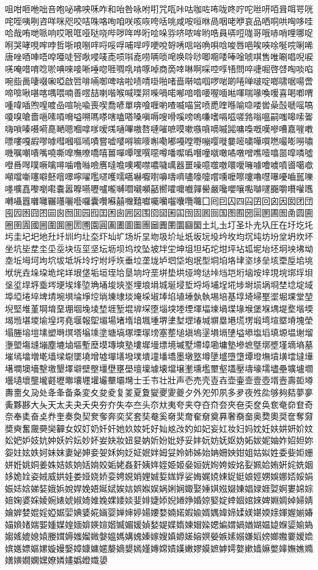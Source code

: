咀咁咂咃咄咅咆咇咈咉咊咋和咍咎咏咐咑咒咓咔咕咖咗咘咙咚咛咜咝咞咟咠咡咢咣咤咥咦咧咨咩咪咫咬咭咮咯咰咱咲咳咴咵咶咷咸咹咺咻咼咽咾咿哀品哂哃哄哅哆哇哈哉哊哋哌响哎哏哐哑哒哓哔哕哖哗哘哙哚哛哜哝哞哟哠員哢哣哤哥哦哧哨哩哪哫哬哭哮哯哰哱哲哳哴哵哶哷哸哹哺哻哼哽哾哿唀唁唂唃唄唅唆唇唈唉唊唋唌唍唎唏唐唑唒唓唔唕唖唗唘唙唚唛唜唝唞唟唠唡唢唣唤唥唦唧唨唩唪唫唬唭售唯唰唱唲唳唴唵唶唷唸唹唺唻唼唽唾唿啀啁啂啃啄啅商啇啈啉啊啋啌啍啎問啐啑啒啓啔啕啖啗啘啙啚啛啜啝啞啟啠啡啢啣啤啥啦啧啨啩啪啫啬啭啮啯啰啱啲啳啴啵啶啷啸啹啺啻啼啽啾啿喀喁喂喃善喅喆喇喈喉喊喋喌喍喎喏喐喑喒喓喔喕喖喗喘喙喚喛喜喝喞喟喠喡喢喣喤喥喦喧喨喩喪喫喬喭單喯喰喱喲喳喴喵営喷喸喹喺喻喼喽喾喿嗀嗁嗂嗃嗄嗅嗆嗇嗈嗉嗊嗋嗌嗍嗎嗏嗐嗑嗒嗓嗔嗕嗖嗗嗘嗙嗚嗛嗜嗝嗞嗟嗠嗡嗢嗣嗤嗥嗦嗧嗨嗩嗪嗫嗬嗭嗮嗯嗰嗱嗲嗳嗴嗵嗶嗷嗸嗹嗺嗻嗼嗽嗾嗿嘀嘁嘂嘃嘄嘅嘆嘇嘈嘉嘊嘋嘌嘍嘎嘏嘐嘑嘒嘓嘔嘕嘖嘗嘘嘙嘚嘛嘜嘝嘞嘟嘠嘡嘢嘣嘤嘥嘦嘧嘨嘩嘪嘫嘬嘭嘮嘯嘰嘱嘲嘳嘴嘵嘶嘷嘸嘹嘺嘻嘼嘽嘾嘿噀噁噂噃噄噅噆噇噈噉噊噋噌噍噎噏噐噑噒噓噔噕噖噗噘噙噚噛噜噝噞噟噠噡噢噣噤噥噦噧器噩噪噫噬噭噮噯噰噱噲噳噴噵噶噷噸噹噺噻噼噽噾噿嚀嚁嚂嚃嚄嚅嚆嚇嚈嚉嚊嚋嚌嚍嚎嚏嚐嚑嚒嚓嚔嚕嚖嚗嚘嚙嚚嚛嚜嚝嚞嚟嚠嚡嚢嚣嚤嚥嚦嚧嚨嚩嚪嚫嚬嚭嚮嚯嚰嚱嚲嚳嚴嚵嚶嚷嚸嚹嚺嚻嚼嚽嚾嚿囀囁囂囃囄囅囆囇囈囉囊囋囌囍囎囏囐囑囒囓囔囕囖囗囘囙囚四囜囝回囟因囡团団囤囥囦囧囨囩囪囫囬园囮囯困囱囲図围囵囶囷囸囹固囻囼国图囿圀圁圂圃圄圅圆圇圈圉圊國圌圍圎圏圐圑園圓圔圕圖圗團圙圚圛圜圝圞土圠圡圢圣圤圥圦圧在圩圪圫圬圭圮圯地圱圲圳圴圵圶圷圸圹场圻圼圽圾圿址坁坂坃坄坅坆均坈坉坊坋坌坍坎坏坐坑坒坓坔坕坖块坘坙坚坛坜坝坞坟坠坡坢坣坤坥坦坧坨坩坪坫坬坭坮坯坰坱坲坳坴坵坶坷坸坹坺坻坼坽坾坿垀垁垂垃垄垅垆垇垈垉垊型垌垍垎垏垐垑垒垓垔垕垖垗垘垙垚垛垜垝垞垟垠垡垢垣垤垥垦垧垨垩垪垫垬垭垮垯垰垱垲垳垴垵垶垷垸垹垺垻垼垽垾垿埀埁埂埃埄埅埆埇埈埉埊埋埌埍城埏埐埑埒埓埔埕埖埗埘埙埚埛埜埝埞域埠埡埢埣埤埥埦埧埨埩埪埫埬埭埮埯埰埱埲埳埴埵埶執埸培基埻埼埽埾埿堀堁堂堃堄堅堆堇堈堉堊堋堌堍堎堏堐堑堒堓堔堕堖堗堘堙堚堛堜堝堞堟堠堡堢堣堤堥堦堧堨堩堪堫堬堭堮堯堰報堲堳場堵堶堷堸堹堺堻堼堽堾堿塀塁塂塃塄塅塆塇塈塉塊塋塌塍塎塏塐塑塒塓塔塕塖塗塘塙塚塛塜塝塞塟塠塡塢塣塤塥塦塧塨塩塪填塬塭塮塯塰塱塲塳塴塵塶塷塸塹塺塻塼塽塾塿墀墁墂境墄墅墆墇墈墉墊墋墌墍墎墏墐墑墒墓墔墕墖増墘墙墚墛墜墝增墟墠墡墢墣墤墥墦墧墨墩墪墫墬墭墮墯墰墱墲墳墴墵墶墷墸墹墺墻墼墽墾墿壀壁壂壃壄壅壆壇壈壉壊壋壌壍壎壏壐壑壒壓壔壕壖壗壘壙壚壛壜壝壞壟壠壡壢壣壤壥壦壧壨壩壪士壬壭壮壯声壱売壳壴壵壶壷壸壹壺壻壼壽壾壿夀夁夂夃处夅夆备夈変夊夋夌复夎夏夐夑夒夓夔夕外夗夘夙多夛夜夝夞够夠夡夢夣夤夥夦大夨天太夫夬夭央夯夰失夲夳头夵夶夷夸夹夺夻夼夽夾夿奀奁奂奃奄奅奆奇奈奉奊奋奌奍奎奏奐契奒奓奔奕奖套奘奙奚奛奜奝奞奟奠奡奢奣奤奥奦奧奨奩奪奫奬奭奮奯奰奱奲女奴奵奶奷奸她奺奻奼好奾奿妀妁如妃妄妅妆妇妈妉妊妋妌妍妎妏妐妑妒妓妔妕妖妗妘妙妚妛妜妝妞妟妠妡妢妣妤妥妦妧妨妩妪妫妬妭妮妯妰妱妲妳妴妵妶妷妸妹妺妻妼妽妾妿姀姁姂姃姄姅姆姇姈姉姊始姌姍姎姏姐姑姒姓委姕姖姗姘姙姚姛姜姝姞姟姠姡姢姣姤姥姦姧姨姩姪姫姬姭姮姯姰姱姲姳姴姵姶姷姸姹姺姻姼姽姾姿娀威娂娃娄娅娆娇娈娉娊娋娌娍娎娏娐娑娒娓娔娕娖娗娘娙娚娛娜娝娞娟娠娡娢娣娤娥娦娧娨娩娪娫娬娭娮娯娰娱娲娳娴娵娶娷娸娹娺娻娼娽娾娿婀婁婂婃婄婅婆婇婈婉婊婋婌婍婎婏婐婑婒婓婔婕婖婗婘婙婚婛婜婝婞婟婠婡婢婣婤婥婦婧婨婩婪婫婬婭婮婯婰婱婲婳婴婵婶婷婸婹婺婻婼婽婾婿媀媁媂媃媄媅媆媇媈媉媊媋媌媍媎媏媐媑媒媓媔媕媖媗媘媙媚媛媜媝媞媟媠媡媢媣媤媥媦媧媨媩媪媫媬媭媮媯媰媱媲媳媴媵媶媷媸媹媺媻媼媽媾媿嫀嫁嫂嫃嫄嫅嫆嫇嫈嫉嫊嫋嫌嫍嫎嫏嫐嫑嫒嫓嫔嫕嫖嫗嫘嫙嫚嫛嫜嫝嫞嫟嫠嫡嫢嫣嫤嫥嫦嫧嫨嫩嫪嫫嫬嫭嫮嫯嫰嫱嫲嫳嫴嫵嫶嫷嫸嫹嫺嫻嫼嫽嫾嫿嬀嬁嬂嬃